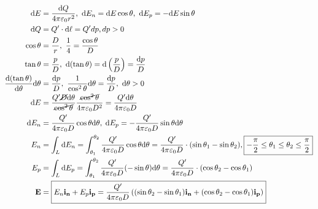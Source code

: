 \begin{align*}
    \mathrm dE &= \frac{\mathrm dQ}{4\pi\varepsilon_0r^2},\ \mathrm dE_n = \mathrm dE\cos\theta,\ \mathrm dE_p = -\mathrm dE\sin\theta\\
    \mathrm dQ &= Q'\cdot\mathrm d\ell = Q'dp, dp > 0\\
    \cos\theta &= \frac{D}{r},\ \frac{1}{4} = \frac{\cos\theta}{D}\\
    \tan\theta &= \frac{p}{D},\ \mathrm d(\tan\theta) = \mathrm d\left(\frac{p}{D}\right) = \frac{\mathrm dp}{D}\\
    \frac{\mathrm d(\tan\theta)}{\mathrm d\theta}\mathrm d\theta &= \frac{\mathrm dp}{D},\ \frac{1}{\cos^2\theta}\mathrm d\theta = \frac{\mathrm dp}{D},\ \mathrm d\theta > 0\\
    \mathrm dE &= \frac{Q'\cancel{D}\mathrm d\theta}{\cancel{\cos^2\theta}}\frac{\cancel{\cos^2\theta}}{4\pi\varepsilon_0D^2} = \frac{Q'\mathrm d\theta}{4\pi\varepsilon_0 D}\\
    \mathrm dE_n &= \frac{Q'}{4\pi\varepsilon_0 D}\cos\theta\mathrm d\theta,\; \mathrm dE_p = -\frac{Q'}{4\pi\varepsilon_0 D}\sin\theta\mathrm d\theta\\
    E_n &= \int_L\mathrm dE_n = \int_{\theta_1}^{\theta_2}\frac{Q'}{4\pi\varepsilon_0 D}\cos\theta\mathrm d\theta = \frac{Q'}{4\pi\varepsilon_0 D}\cdot (\sin\theta_1 - \sin\theta_2), \boxed{-\frac{\pi}{2}\leq\theta_1\leq\theta_2\leq\frac{\pi}{2}}\\
    E_p &= \int_L\mathrm dE_p = \int_{\theta_1}^{\theta_2}\frac{Q'}{4\pi\varepsilon_0 D}(-\sin\theta)\mathrm d\theta = \frac{Q'}{4\pi\varepsilon_0 D}\cdot (\cos\theta_2 - \cos\theta_1)\\
    \mathbf{E} &= \boxed{E_n\mathbf{i_n} + E_p\mathbf{i_p} = \frac{Q'}{4\pi\varepsilon_0 D}\left((\sin\theta_2 - \sin\theta_1)\mathbf{i_n} + (\cos\theta_2 - \cos\theta_1)\mathbf{i_p}\right)}
\end{align*}